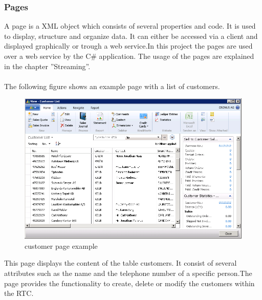   \subsubsection{Pages}
  A page is a XML object which consists of several properties and code. It is used to display, structure and organize data. It can either be accessed via a client and displayed graphically or trough a web service.In this project the pages are used over a web service by the C\# application. The usage of the pages are explained in the chapter ''Streaming''. 
  \\\\
  The following figure shows an example page with a list of customers.
  \begin{figure}[htbp]
  \centering
  \includegraphics[width=\textwidth,height=\textheight,keepaspectratio]{graphics/customerlist.PNG}
  \caption{customer page example}
  \end{figure}
  \newline
  This page displays the content of the table customers.
  It consist of several attributes such as the name and the telephone number of a specific person.The page provides the functionality to create, delete or  modify the customers within the RTC.    
 

